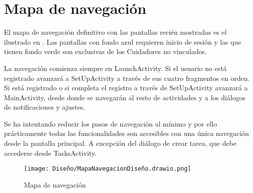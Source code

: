 \section{Mapa de navegación}

El mapa de navegación definitivo con las pantallas recién mostradas es el ilustrado en . Las pantallas con fondo azul requieren inicio de sesión y las que tienen fondo verde son exclusivas de los Cuidadores no vinculados.

La navegación comienza siempre en LaunchActivity. Si el usuario no está registrado avanzará a SetUpActivity a través de sus cuatro fragmentos en orden. Si está registrado o si completa el registro a través de SetUpActivity avanzará a MainActivity, desde donde se navegarán al resto de actividades y a los diálogos de notificaciones y ajustes. 

Se ha intentando reducir los pasos de navegación al mínimo y por ello prácticamente todas las funcionalidades son accesibles con una única navegación desde la pantalla principal. A excepción del diálogo de crear tarea, que debe accederse desde TasksActivity.

\begin{figure}[H]
    \centering
    \texttt{[image: Diseño/MapaNavegacionDiseño.drawio.png]}
    \caption{Mapa de navegación}
    \label{scr:navigation}
\end{figure}